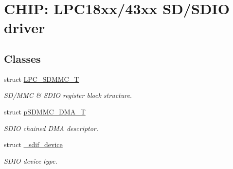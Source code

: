 \hypertarget{group___s_d_i_f__18_x_x__43_x_x}{}\section{C\+H\+IP\+: L\+P\+C18xx/43xx S\+D/\+S\+D\+IO driver}
\label{group___s_d_i_f__18_x_x__43_x_x}
\subsection*{Classes}
\begin{DoxyCompactItemize}
\item 
struct \hyperlink{struct_l_p_c___s_d_m_m_c___t}{L\+P\+C\+\_\+\+S\+D\+M\+M\+C\+\_\+T}
\begin{DoxyCompactList}\small\item\em S\+D/\+M\+MC \& S\+D\+IO register block structure. \end{DoxyCompactList}\item 
struct \hyperlink{structp_s_d_m_m_c___d_m_a___t}{p\+S\+D\+M\+M\+C\+\_\+\+D\+M\+A\+\_\+T}
\begin{DoxyCompactList}\small\item\em S\+D\+IO chained D\+MA descriptor. \end{DoxyCompactList}\item 
struct \hyperlink{struct__sdif__device}{\+\_\+sdif\+\_\+device}
\begin{DoxyCompactList}\small\item\em S\+D\+IO device type. \end{DoxyCompactList}\end{DoxyCompactItemize}
